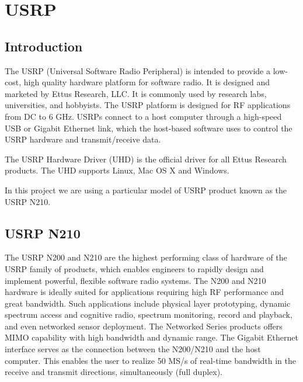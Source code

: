 \chapter{USRP}
\section{Introduction}

The USRP (Universal Software Radio Peripheral) is intended to provide a low-cost, high quality hardware platform for software radio. It is designed and marketed by Ettus Research, LLC. It is commonly used by research labs, universities, and hobbyists. The USRP platform is designed for RF applications from DC to 6 GHz. USRPs connect to a host computer through a high-speed USB or Gigabit Ethernet link, which the host-based software uses to control the USRP hardware and transmit/receive data.

The USRP Hardware Driver (UHD) is the official driver for all Ettus Research products. The UHD supports Linux, Mac OS X and Windows.

In this project we are using a particular model of USRP product known as the USRP N210.

\section{USRP N210}

The USRP N200 and N210 are the highest performing class of hardware of the USRP family of products, which enables engineers to rapidly design and implement powerful, flexible software radio systems. The N200 and N210 hardware is ideally suited for applications requiring high RF performance and great bandwidth. Such applications include physical layer prototyping, dynamic spectrum access and cognitive radio, spectrum monitoring, record and playback, and even networked sensor deployment.
The Networked Series products offers MIMO capability with high bandwidth and dynamic range. The Gigabit Ethernet interface serves as the connection between the N200/N210 and the host computer. This enables the user to realize 50 MS/s of real-time bandwidth in the receive and transmit directions, simultaneously (full duplex).


